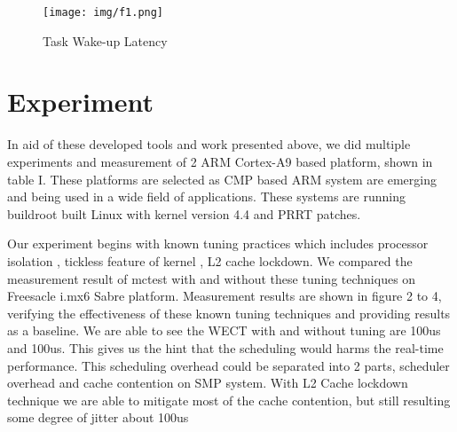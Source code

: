 \documentclass[conference]{IEEEtran}
\begin{document}
    \begin{figure} \centering \texttt{[image: img/f1.png]} \caption{Task Wake-up Latency}
    \label{fig:latency_timeline} \end{figure}

\section{Experiment}

    In aid of these developed tools and work presented above, we did multiple experiments and measurement of 2 ARM
    Cortex-A9 based platform, shown in table I. These platforms are selected as CMP based ARM system are emerging and
    being used in a wide field of applications. These systems are running buildroot \cite{buildroot} built Linux with
    kernel version 4.4 and PR\textunderscore RT \cite{preemptrt} patches.


    Our experiment begins with known tuning practices which includes processor isolation \cite{isolatedcpu}, tickless
    feature of kernel \cite{tickless}, L2 cache lockdown. We compared the measurement result of mctest with and without
    these tuning techniques on Freesacle i.mx6 Sabre platform. Measurement results are shown in figure 2 to 4, verifying
    the effectiveness of these known tuning techniques and providing results as a baseline. We are able to see the WECT
    with and without tuning are 100us and 100us. This gives us the hint that the scheduling  would harms the real-time
    performance. This scheduling overhead could be separated into 2 parts, scheduler overhead and cache contention on
    SMP system. With L2 Cache lockdown technique we are able to mitigate most of the cache contention, but still
    resulting some degree of jitter about 100us
    
\end{document}
